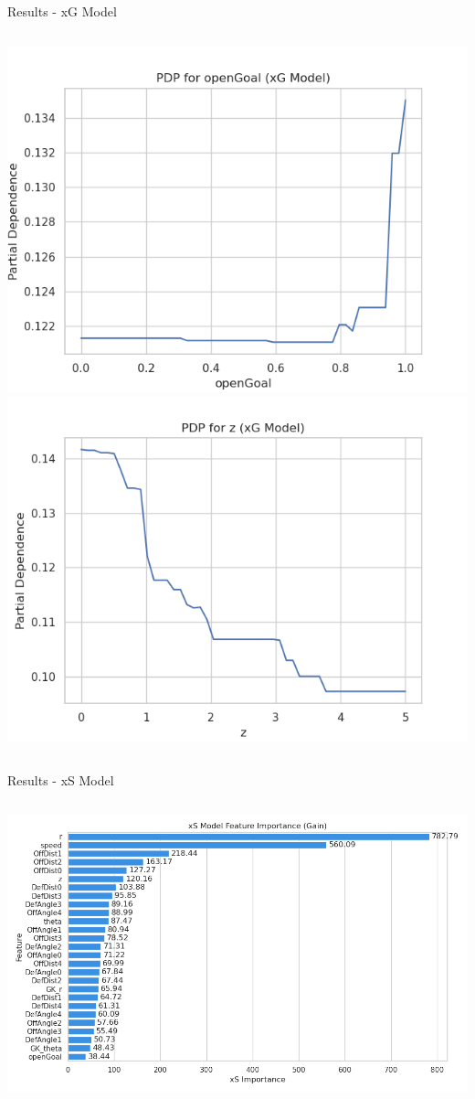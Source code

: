 \documentclass{beamer}
\begin{document}
\begin{frame}{Results - xG Model}
\begin{columns}[c]
  \includegraphics[width=\linewidth]{figures/xG_PDP_openGoal.png}
  \includegraphics[width=\linewidth]{figures/xG_PDP_z.png}
\end{columns}
\end{frame}

\begin{frame}{Results - xS Model}
\begin{columns}[c]
  \includegraphics[width=\linewidth]{figures/xS_feature_importance.png}
\end{columns}
\end{frame}
\end{document}
